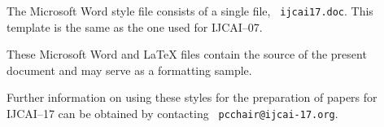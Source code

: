 \documentclass{article}
\theoremstyle{definition}
\begin{document}
The Microsoft Word style file consists of a single file, {\tt
ijcai17.doc}. This template is the same as the one used for
IJCAI--07.

These Microsoft Word and \LaTeX{} files contain the source of the
present document and may serve as a formatting sample.  

Further information on using these styles for the preparation of
papers for IJCAI--17 can be obtained by contacting {\tt
pcchair@ijcai-17.org}.



\end{document}
